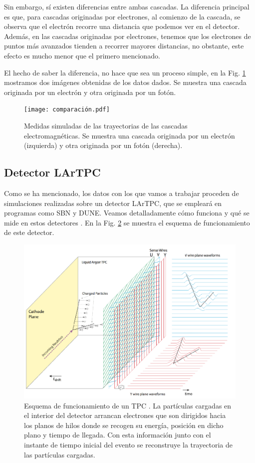 \documentclass[a4paper,12pt,oneside,titlepage]{book}
\begin{document}
Sin embargo, sí existen diferencias entre ambas cascadas. La diferencia principal es que, para cascadas originadas por electrones, al comienzo de la cascada, se observa que el electrón recorre una distancia que podemos ver en el detector. Además, en las cascadas originadas por electrones, tenemos que los electrones de puntos más avanzados tienden a recorrer mayores distancias, no obstante, este efecto es mucho menor que el primero mencionado.

El hecho de saber la diferencia, no hace que sea un proceso simple, en la Fig. \ref{fig:comparacion_cascadas} mostramos dos imágenes obtenidas de los datos dados. Se muestra una cascada originada por un electrón y otra originada por un fotón.

\begin{figure}[h!]
  \centering
  \texttt{[image: comparación.pdf]}
  \caption{Medidas simuladas de las trayectorias de las cascadas electromagnéticas. Se muestra una cascada originada por un electrón (izquierda) y otra originada por un fotón (derecha).}
  \label{fig:comparacion_cascadas}
\end{figure}

\subsection{Detector LArTPC}
\label{sec:lartpc}
Como se ha mencionado, los datos con los que vamos a trabajar proceden de simulaciones realizadas sobre un detector LArTPC, que se empleará en programas como SBN y DUNE. Veamos detalladamente cómo funciona y qué se mide en estos detectores \cite{sbnd}. En la Fig. \ref{fig:sensado} se muestra el esquema de funcionamiento de este detector.

\begin{figure}[h!]
  \centering
  \includegraphics[scale=0.65]{planos_sensado.PNG}
  \caption{Esquema de funcionamiento de un TPC \cite{sbnd}. La partículas cargadas en el interior del detector arrancan electrones que son dirigidos hacia los planos de hilos donde se recogen su energía, posición en dicho plano y tiempo de llegada. Con esta información junto con el instante de tiempo inicial del evento se reconstruye la trayectoria de las partículas cargadas.}
  \label{fig:sensado}
\end{figure}
\end{document}
